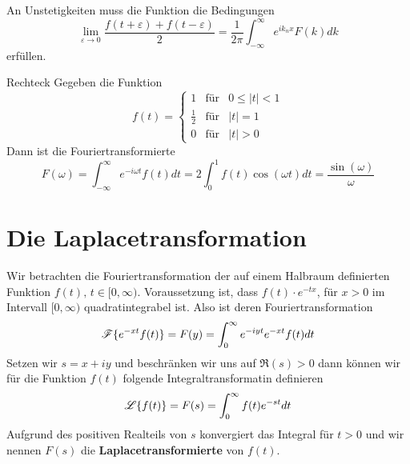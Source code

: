 An Unstetigkeiten muss die Funktion die Bedingungen 
\[
  \lim_{\varepsilon\rightarrow 0}\frac{f(t+\varepsilon)+f(t-\varepsilon)}{2}=
  \frac{1}{2\pi}\int_{-\infty}^{\infty}e^{ik_nx}F(k)dk
\]  
erfüllen.
\begin{example}{Rechteck}
Gegeben die Funktion
  \[  
  f(t)=\left\{
    	\begin{array}{ccl}
    		1&\mbox{f\"ur}&0\le|t|<1\\ 
    		\frac{1}{2}&\mbox{f\"ur}&|t|=1\\
    		0&\mbox{f\"ur}&|t|>0 
         \end{array}
	\right.
\]
Dann ist die Fouriertransformierte
\[
  F(\omega)=\int_{-\infty}^{\infty}e^{-i\omega t}f(t)dt=
  2\int_{0}^{1}f(t)\cos(\omega t)dt=\frac{\sin(\omega)}{\omega}
\]
\end{example}
\section{Die Laplacetransformation}
Wir betrachten die Fouriertransformation der auf einem Halbraum definierten
Funktion $f(t)\mbox{, }t\in[0,\infty)$. Voraussetzung ist, dass $f(t)\cdot
e^{-tx}$, für $x>0$ im Intervall $[0,\infty)$ quadratintegrabel ist. Also ist
deren Fouriertransformation
\begin{equation}\label{eq:prelaplacetrafo}
{\cal F}\{e^{-xt}f(t)\}=F(y)=\int_0^\infty e^{-iyt}e^{-xt}f(t)dt
\end{equation}
Setzen wir $s=x+iy$ und beschränken wir uns auf $\Re(s)>0$ dann können wir für die 
Funktion $f(t)$ folgende Integraltransformatin definieren 
\begin{equation}\label{eq:Laplacetrafo}
  {\cal L}\{f(t)\}=F(s)=\int_0^\infty f(t) e^{-st}dt
\end{equation}
Aufgrund des positiven Realteils von $s$ konvergiert das Integral für $t>0$
und wir nennen $F(s)$ die {\bf Laplacetransformierte} von $f(t)$.

